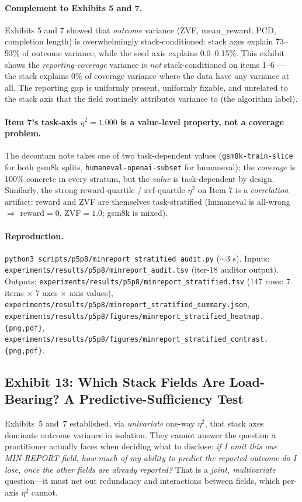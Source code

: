 \documentclass{article}  \usepackage[preprint,nonatbib]{neurips_2026} \usepackage[numbers]{natbib}
\begin{document}
\paragraph{Complement to Exhibits 5 and 7.}
Exhibits 5 and 7 showed that \emph{outcome} variance (ZVF, mean\_reward,
PCD, completion length) is overwhelmingly stack-conditioned:
stack axes explain 73--93\% of outcome variance, while the seed axis
explains 0.0--0.15\%. This exhibit shows the \emph{reporting-coverage}
variance is \emph{not} stack-conditioned on items 1--6 --- the stack
explains 0\% of coverage variance where the data have any variance at
all. The reporting gap is uniformly present, uniformly fixable, and
unrelated to the stack axis that the field routinely attributes
variance to (the algorithm label).

\paragraph{Item 7's task-axis $\eta^{2}=1.000$ is a value-level
property, not a coverage problem.}
The decontam note takes one of two task-dependent values
(\texttt{gsm8k-train-slice} for both gsm8k splits,
\texttt{humaneval-openai-subset} for humaneval); the \emph{coverage} is
100\% concrete in every stratum, but the \emph{value} is task-dependent
by design. Similarly, the strong reward-quartile / zvf-quartile
$\eta^{2}$ on Item 7 is a \emph{correlation} artifact: reward and ZVF
are themselves task-stratified (humaneval is all-wrong $\Rightarrow$
reward$=0$, ZVF$=1.0$; gsm8k is mixed).

\paragraph{Reproduction.}
\texttt{python3 scripts/p5p8/minreport\_stratified\_audit.py}
($\sim$3 s). Inputs:
\texttt{experiments/results/p5p8/minreport\_audit.tsv} (iter-18
auditor output). Outputs:
\texttt{experiments/results/p5p8/minreport\_stratified.tsv} (147 rows: 7
items $\times$ 7 axes $\times$ axis values),
\texttt{experiments/results/p5p8/minreport\_stratified\_summary.json},
\texttt{experiments/results/p5p8/figures/minreport\_stratified\_heatmap.\{png,pdf\}},
\texttt{experiments/results/p5p8/figures/minreport\_stratified\_contrast.\{png,pdf\}}.

\subsection{Exhibit 13: Which Stack Fields Are Load-Bearing? A Predictive-Sufficiency Test}
\label{sec:p5-exhibit-field-suff}
Exhibits~5 and~7 established, via \emph{univariate} one-way $\eta^{2}$, that
stack axes dominate outcome variance in isolation. They cannot answer the
question a practitioner actually faces when deciding what to disclose:
\emph{if I omit this one MIN-REPORT field, how much of my ability to predict
the reported outcome do I lose, once the other fields are already reported?}
That is a \emph{joint, multivariate} question---it must net out redundancy and
interactions between fields, which per-axis $\eta^{2}$ cannot.
\end{document}
